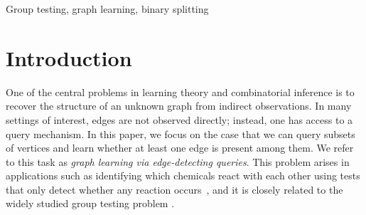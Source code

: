 \documentclass[journal]{IEEEtran}
\theoremstyle{definition}
\theoremstyle{definition}
\newcommand{\ER}{\mathrm{ER}}
\newcommand{\kb}{\overline{k}}
\newcommand{\bigO}{\mathcal{O}}
\begin{document}
\begin{abstract}
We study the problem of learning an unknown graph via group queries on vertex subsets, where each query reports whether at least one edge is present among the queried vertices. In general, learning arbitrary graphs with \(n\) vertices and \(k\) edges is hard in the non\mbox{-}adaptive setting, requiring \(\Omega \big(\min\{k^2\log n,\,n^2\}\big)\) tests even when a small error probability is allowed. We focus on learning Erd\H{o}s–R\'enyi (ER) graphs \(G\sim\ER(n,q)\) in the non\mbox{-}adaptive setting, where the expected number of edges is \(\kb=q\binom{n}{2}\), and we aim to design an efficient testing–decoding scheme, namely, a non-adaptive test design together with a decoding algorithm, achieving asymptotically vanishing error probability. Prior work (Li–Fresacher–Scarlett, NeurIPS 2019) presents a testing–decoding scheme that attains an order\mbox{-}optimal number of tests \(\bigO(\kb\log n)\) but incurs \(\Omega(n^2)\) decoding time, whereas their proposed sublinear-time algorithm incurs an extra $\log \kb \cdot \log n$ factor in the number of tests. We extend the binary splitting approach—recently developed for non\mbox{-}adaptive group testing—to the ER graph learning setting, and prove that the edge set can be recovered with high probability using \(\bigO(\kb\log n)\) tests while attaining decoding time \(\bigO(\kb^{1+\delta}\log n)\) for any fixed \(\delta>0\).
\end{abstract}

\begin{IEEEkeywords}
Group testing, graph learning, binary splitting
\end{IEEEkeywords}


\IEEEpeerreviewmaketitle

\section{Introduction}
\label{sec:intro}


One of the central problems in learning theory and combinatorial inference is to recover the structure of an unknown graph from indirect observations. In many settings of interest, edges are not observed directly; instead, one has access to a query mechanism. In this paper, we focus on the case that we can query subsets of vertices and learn whether at least one edge is present among them. We refer to this task as \emph{graph learning via edge-detecting queries}. This problem arises in applications such as identifying which chemicals react with each other using tests that only detect whether any reaction occurs~\cite{bouvel2005combinatorial}, and it is closely related to the widely studied group testing problem \cite{aldridge2019group}.
\end{document}
